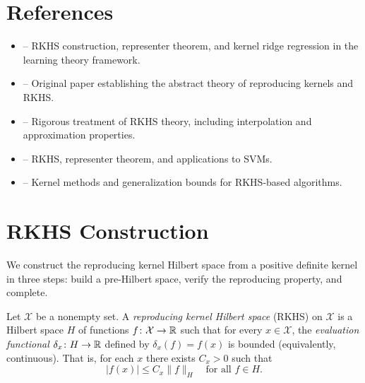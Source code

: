 \documentclass[11pt,a4paper]{article}
\begin{document}

\section{References}
\label{sec:references}

\begin{itemize}
    \item \citet[Chapter 5]{bach2024} -- RKHS construction,
    representer theorem, and kernel ridge regression in the
    learning theory framework.
    \item \citet{aronszajn1950} -- Original paper establishing the
    abstract theory of reproducing kernels and RKHS.
    \item \citet[Chapters 4--5]{steinwart2008} -- Rigorous treatment
    of RKHS theory, including interpolation and approximation
    properties.
    \item \citet[Chapter 2]{scholkopf2002} -- RKHS, representer
    theorem, and applications to SVMs.
    \item \citet[Chapter 6]{mohri2018} -- Kernel methods and
    generalization bounds for RKHS-based algorithms.
\end{itemize}


\section{RKHS Construction}
\label{sec:rkhs-construction}

We construct the reproducing kernel Hilbert space from a positive
definite kernel in three steps: build a pre-Hilbert space, verify
the reproducing property, and complete.

\begin{definition}
\label{def:rkhs}
Let $\mathcal{X}$ be a nonempty set. A \emph{reproducing kernel
Hilbert space} (RKHS) on $\mathcal{X}$ is a Hilbert space $H$ of
functions $f \colon \mathcal{X} \to \mathbb{R}$ such that for every
$x \in \mathcal{X}$, the \emph{evaluation functional}
$\delta_x \colon H \to \mathbb{R}$ defined by $\delta_x(f) = f(x)$ is
bounded (equivalently, continuous). That is, for each $x$ there
exists $C_x > 0$ such that
\begin{equation}
\label{eq:rkhs-bound}
|f(x)| \le C_x \|f\|_H \quad \text{for all } f \in H.
\end{equation}
\end{definition}
\end{document}
